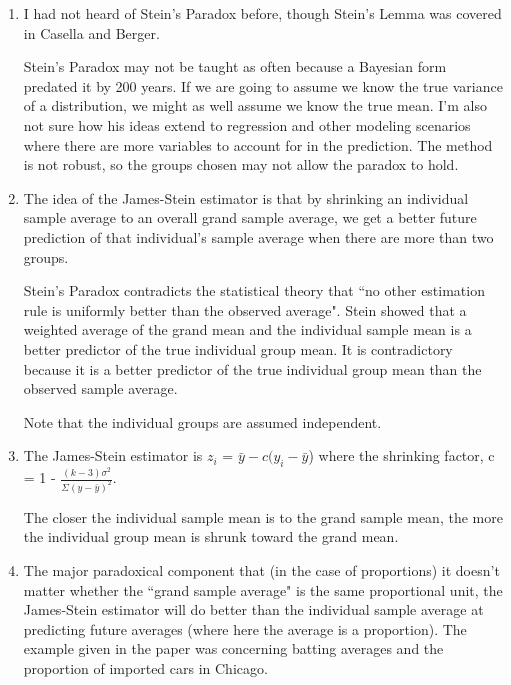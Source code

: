 \documentclass{article}\usepackage[]{graphicx}\usepackage[]{color}
\begin{document}
  
\begin{enumerate}
\item%

I had not heard of Stein's Paradox before, though Stein's Lemma was covered in Casella and Berger. 

Stein's Paradox may not be taught as often because a Bayesian form predated it by 200 years. If we are going to assume we know the true variance of a distribution, we might as well assume we know the true mean. I'm also not sure how his ideas extend to regression and other modeling scenarios where there are more variables to account for in the prediction. The method is not robust, so the groups chosen may not allow the paradox to hold.

\item%

The idea of the James-Stein estimator is that by shrinking an individual sample average to an overall grand sample average, we get a better future prediction of that individual's sample average when there are more than two groups.

Stein's Paradox contradicts the statistical theory that ``no other estimation rule is uniformly better than the observed average". Stein showed that a weighted average of the grand mean and the individual sample mean is a better predictor of the true individual group mean. It is contradictory because it is a better predictor of the true individual group mean than the observed sample average.

Note that the individual groups are assumed independent.


\item%

The James-Stein estimator is $z_{i}$ = $\bar{y} - c(y_{i} - \bar{y}$) where the shrinking factor, c = 1 - $\frac{(k-3)\sigma^2}{\Sigma(y-\bar{y})^2}$.

The closer the individual sample mean is to the grand sample mean, the more the individual group mean is shrunk toward the grand mean.

\item%

The major paradoxical component that (in the case of proportions) it doesn't matter whether the ``grand sample average" is the same proportional unit, the James-Stein estimator will do better than the individual sample average at predicting future averages (where here the average is a proportion). The example given in the paper was concerning batting averages and the proportion of imported cars in Chicago.


\end{enumerate}
\end{document}
